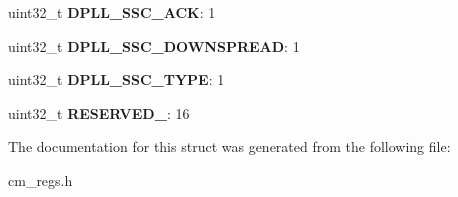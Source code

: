 \begin{DoxyCompactItemize}
\item 
\hypertarget{structCM__CLKMODE__DPLL__ABE_a55ed5be925bf967344019abdf617a115}{uint32\-\_\-t {\bfseries D\-P\-L\-L\-\_\-\-S\-S\-C\-\_\-\-A\-C\-K}\-: 1}\label{structCM__CLKMODE__DPLL__ABE_a55ed5be925bf967344019abdf617a115}

\item 
\hypertarget{structCM__CLKMODE__DPLL__ABE_a042895230bf73a4fa94a493ef71aa997}{uint32\-\_\-t {\bfseries D\-P\-L\-L\-\_\-\-S\-S\-C\-\_\-\-D\-O\-W\-N\-S\-P\-R\-E\-A\-D}\-: 1}\label{structCM__CLKMODE__DPLL__ABE_a042895230bf73a4fa94a493ef71aa997}

\item 
\hypertarget{structCM__CLKMODE__DPLL__ABE_a596b8fe07908eb996995a4f9da7785bb}{uint32\-\_\-t {\bfseries D\-P\-L\-L\-\_\-\-S\-S\-C\-\_\-\-T\-Y\-P\-E}\-: 1}\label{structCM__CLKMODE__DPLL__ABE_a596b8fe07908eb996995a4f9da7785bb}

\item 
\hypertarget{structCM__CLKMODE__DPLL__ABE_a02e7ee6246cb20fa0ec881a0ba9560d8}{uint32\-\_\-t {\bfseries R\-E\-S\-E\-R\-V\-E\-D\-\_}\-: 16}\label{structCM__CLKMODE__DPLL__ABE_a02e7ee6246cb20fa0ec881a0ba9560d8}

\end{DoxyCompactItemize}


The documentation for this struct was generated from the following file\-:\begin{DoxyCompactItemize}
\item 
cm\-\_\-regs.\-h\end{DoxyCompactItemize}
